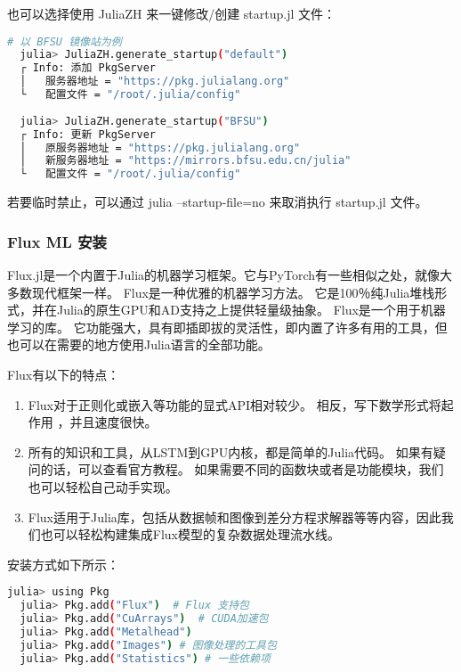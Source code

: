 \documentclass[lang=cn,a4paper,newtx]{elegantpaper}
\begin{document}
\begin{enumerate}[label=\arabic*). ]
  也可以选择使用 JuliaZH 来一键修改/创建 startup.jl 文件：
\begin{lstlisting}[language=bash]
  # 以 BFSU 镜像站为例
  julia> JuliaZH.generate_startup("default")
  ┌ Info: 添加 PkgServer
  │   服务器地址 = "https://pkg.julialang.org"
  └   配置文件 = "/root/.julia/config"
  
  julia> JuliaZH.generate_startup("BFSU")
  ┌ Info: 更新 PkgServer
  │   原服务器地址 = "https://pkg.julialang.org"
  │   新服务器地址 = "https://mirrors.bfsu.edu.cn/julia"
  └   配置文件 = "/root/.julia/config"
\end{lstlisting}
  
  若要临时禁止，可以通过 julia --startup-file=no 来取消执行 startup.jl 文件。
\end{enumerate}


\subsubsection{Flux ML 安装}
Flux.jl是一个内置于Julia的机器学习框架。它与PyTorch有一些相似之处，就像大多数现代框架一样。
Flux是一种优雅的机器学习方法。 它是100％纯Julia堆栈形式，并在Julia的原生GPU和AD支持之上提供轻量级抽象。
Flux是一个用于机器学习的库。 它功能强大，具有即插即拔的灵活性，即内置了许多有用的工具，但也可以在需要的地方使用Julia语言的全部功能。

Flux有以下的特点：
\begin{enumerate}[label=\arabic*)]
  \item Flux对于正则化或嵌入等功能的显式API相对较少。 相反，写下数学形式将起作用 ，并且速度很快。
  \item 所有的知识和工具，从LSTM到GPU内核，都是简单的Julia代码。 如果有疑问的话，可以查看官方教程。 如果需要不同的函数块或者是功能模块，我们也可以轻松自己动手实现。
  \item Flux适用于Julia库，包括从数据帧和图像到差分方程求解器等等内容，因此我们也可以轻松构建集成Flux模型的复杂数据处理流水线。
\end{enumerate}

安装方式如下所示：
\begin{lstlisting}[language=bash]
  julia> using Pkg
  julia> Pkg.add("Flux")  # Flux 支持包
  julia> Pkg.add("CuArrays")  # CUDA加速包
  julia> Pkg.add("Metalhead")
  julia> Pkg.add("Images") # 图像处理的工具包
  julia> Pkg.add("Statistics") # 一些依赖项
\end{lstlisting}
\end{document}
